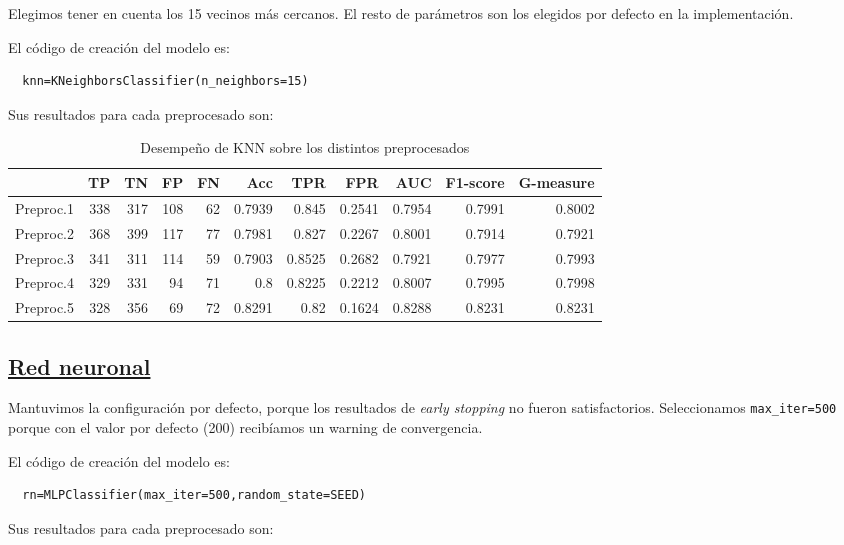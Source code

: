 \documentclass{article}
\begin{document}
Elegimos tener en cuenta los 15 vecinos más cercanos. El resto de
parámetros son los elegidos por defecto en la implementación.

El código de creación del modelo es:
\begin{lstlisting}
  knn=KNeighborsClassifier(n_neighbors=15)
\end{lstlisting}

Sus resultados para cada preprocesado son:

\begin{table}[H]
\centering
\caption{Desempeño de KNN sobre los distintos preprocesados}
\label{tab:knn}
\begin{tabular}{|lrrrrrrrrrr|}
\hline
 & TP & TN & FP & FN & Acc & TPR & FPR & AUC & F1-score & G-measure\\ \hline
  Preproc.1 & 338 & 317 & 108 & 62 & 0.7939 & 0.845 & 0.2541 & 0.7954 & 0.7991 & 0.8002\\
  Preproc.2 & 368 & 399 & 117 & 77 & 0.7981 & 0.827 & 0.2267 & 0.8001 & 0.7914 & 0.7921\\
  Preproc.3 & 341 & 311 & 114 & 59 & 0.7903 & 0.8525 & 0.2682 & 0.7921 & 0.7977 & 0.7993\\
  Preproc.4 & 329 & 331 & 94 & 71 & 0.8 & 0.8225 & 0.2212 & 0.8007 & 0.7995 & 0.7998\\
  Preproc.5 & 328 & 356 & 69 & 72 & 0.8291 & 0.82 & 0.1624 & 0.8288 & 0.8231 & 0.8231\\
\hline
\end{tabular}
\end{table}

\subsection{\href{https://scikit-learn.org/stable/modules/generated/sklearn.neural_network.MLPClassifier.html}{Red neuronal}}

Mantuvimos la configuración por defecto, porque los resultados de
\emph{early stopping} no fueron satisfactorios. Seleccionamos
\texttt{max\_iter=500} porque con el valor por defecto (200)
recibíamos un warning de convergencia.

El código de creación del modelo es:
\begin{lstlisting}
  rn=MLPClassifier(max_iter=500,random_state=SEED)
\end{lstlisting}

Sus resultados para cada preprocesado son:
\end{document}
